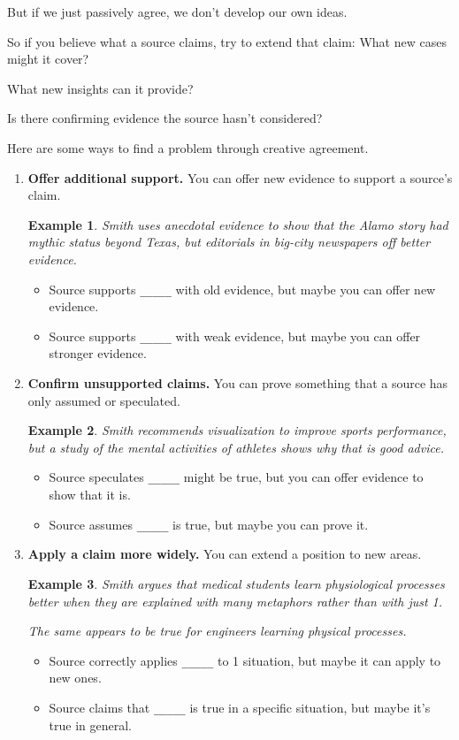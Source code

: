 \documentclass[oneside]{book}
\numberwithin{equation}{section}
\newtheorem{example}{Example}[section]
\begin{document}
But if we just passively agree, we don't develop our own ideas.

So if you believe what a source claims, try to extend that claim: What new cases might it cover?

What new insights can it provide?

Is there confirming evidence the source hasn't considered?

Here are some ways to find a problem through creative agreement.
\begin{enumerate}
    \item \textbf{Offer additional support.} You can offer new evidence to support a source's claim.
    \begin{example}
        Smith uses anecdotal evidence to show that the Alamo story had mythic status beyond Texas, but editorials in big-city newspapers off better evidence.
    \end{example}
    \begin{itemize}
        \item Source supports \verb|_____| with old evidence, but maybe you can offer new evidence.
        \item Source supports \verb|_____| with weak evidence, but maybe you can offer stronger evidence.
    \end{itemize}
    \item \textbf{Confirm unsupported claims.} You can prove something that a source has only assumed or speculated.
    \begin{example}
        Smith recommends visualization to improve sports performance, but a study of the mental activities of athletes shows why that is good advice.
    \end{example}
    \begin{itemize}
        \item Source speculates \verb|_____| might be true, but you can offer evidence to show that it is.
        \item Source assumes \verb|_____| is true, but maybe you can prove it.
    \end{itemize}
    \item \textbf{Apply a claim more widely.} You can extend a position to new areas.
    \begin{example}
        Smith argues that medical students learn physiological processes better when they are explained with many metaphors rather than with just 1.
        
        The same appears to be true for engineers learning physical processes.
    \end{example}
    \begin{itemize}
        \item Source correctly applies \verb|_____| to 1 situation, but maybe it can apply to new ones.
        \item Source claims that \verb|_____| is true in a specific situation, but maybe it's true in general.
    \end{itemize}
\end{enumerate}
\end{document}
